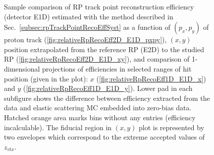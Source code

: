 \begin{figure}[h]
{\begin{subfigure}[b]{\linewidth}
		\end{subfigure}
	}
	\caption[Coparison of estimated RP track point reconstruction efficiency in 2D and 1D (detector E1D).]%
	{Sample comparison of RP track point reconstruction efficiency (detector E1D) estimated with the method described in Sec.~\ref{subsec:rpTrackPointRecoEffSyst} as a function of $(p_{x},p_{y})$ of proton track (\ref{fig:relativeRpRecoEff2D_E1D_pxpy}), $(x,y)$ position extrapolated from the reference RP (E2D) to the studied RP (\ref{fig:relativeRpRecoEff2D_E1D_xy}), and comparison of 1-dimensional projections of efficiencies in selected ranges of hit position (given in the plot): $x$ (\ref{fig:relativeRpRecoEff1D_E1D_x}) and $y$ (\ref{fig:relativeRpRecoEff1D_E1D_y}). Lower pad in each subfigure shows the difference between efficiency extracted from the data and elastic scattering MC embedded into zero-bias data. Hatched orange area marks bins without any entries (efficiency incalculable). The fiducial region in $(x,y)$ plot is represented by two envelopes which correspond to the extreme accepted values of $z_{vtx}$.%
	}\label{fig:relativeRpRecoEff_E1D}
\end{figure}







